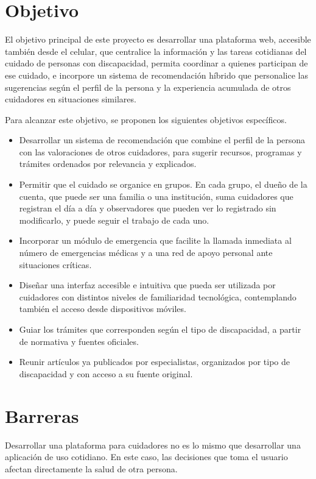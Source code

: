 \section{Objetivo}

El objetivo principal de este proyecto es desarrollar una plataforma web, accesible también desde el celular, que centralice la información y las tareas cotidianas del cuidado de personas con discapacidad, permita coordinar a quienes participan de ese cuidado, e incorpore un sistema de recomendación híbrido que personalice las sugerencias según el perfil de la persona y la experiencia acumulada de otros cuidadores en situaciones similares.

Para alcanzar este objetivo, se proponen los siguientes objetivos específicos.

\begin{itemize}
    \item Desarrollar un sistema de recomendación que combine el perfil de la persona con las valoraciones de otros cuidadores, para sugerir recursos, programas y trámites ordenados por relevancia y explicados.
    \item Permitir que el cuidado se organice en grupos. En cada grupo, el dueño de la cuenta, que puede ser una familia o una institución, suma cuidadores que registran el día a día y observadores que pueden ver lo registrado sin modificarlo, y puede seguir el trabajo de cada uno.
    \item Incorporar un módulo de emergencia que facilite la llamada inmediata al número de emergencias médicas y a una red de apoyo personal ante situaciones críticas.
    \item Diseñar una interfaz accesible e intuitiva que pueda ser utilizada por cuidadores con distintos niveles de familiaridad tecnológica, contemplando también el acceso desde dispositivos móviles.
    \item Guiar los trámites que corresponden según el tipo de discapacidad, a partir de normativa y fuentes oficiales.
    \item Reunir artículos ya publicados por especialistas, organizados por tipo de discapacidad y con acceso a su fuente original.
\end{itemize}

\section{Barreras}

Desarrollar una plataforma para cuidadores no es lo mismo que desarrollar una aplicación de uso cotidiano. En este caso, las decisiones que toma el usuario afectan directamente la salud de otra persona.

